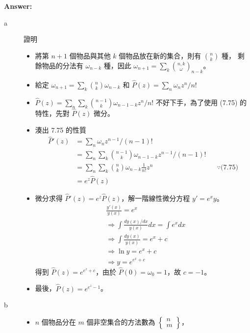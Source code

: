 \documentclass[11pt,fleqn]{article}
\renewcommand\part[1]{\vspace{.10in}\textbf{#1}}
\begin{document}
\part{Answer:}

\begin{description}
	\item[a] 證明
		\begin{itemize}
			\item 將第 $n+1$ 個物品與其他 $k$ 個物品放在新的集合，則有 $\binom{n}{k}$ 種，
				剩餘物品的分法有 $\omega_{n-k}$ 種，因此 $\omega_{n+1} = \sum_k \binom{n, k} \omega_{n-k}$。
			\item 給定 $\omega_{n+1} = \sum_k \binom{n}{k} \omega_{n-k}$ 和
					$\widehat{P}(z) = \sum_n \omega_n z^n / n!$
			\item $\widehat{P}(z) = \sum_n \sum_k \binom{n-1}{k} \omega_{n-1-k} z^n / n!$ 
				不好下手，為了使用 (7.75) 的特性，先對 $\widehat{P}(z)$ 微分。
			\item 湊出 7.75 的性質
				\begin{align*}
					\widehat{P}'(z) 
					&= \sum_n \omega_{n} z^{n-1}/(n-1)! \\
					&= \sum_n \sum_k \binom{n-1}{k} \omega_{n-1-k} z^{n-1}/(n-1)! \\
					&= \sum_n \sum_k \binom{n}{k} \omega_{n-k} \frac{1}{n!} z^{n} 
						&& \because \text{(7.75)} \\
					&= e^z \widehat{P}(z)
				\end{align*}
			\item
				微分求得 $\widehat{P}'(z) = e^z \widehat{P}(z)$，解一階線性微分方程 $y' = e^x y$。
				\begin{align*}
					& \frac{y'(x)}{y(x)} = e^x \\
					& \Rightarrow \int \frac{d y(x) / dx}{y(x)} dx = \int e^x dx \\
					& \Rightarrow \int \frac{d y(x)}{y(x)} = e^x + c \\
					& \Rightarrow \ln y = e^x + c\\
					& \Rightarrow y = e^{e^x + c}
				\end{align*}
				得到 $\widehat{P}(z) = e^{e^z+c}$，由於 $\widehat{P}(0)=\omega_0=1$，故 $c=-1$。
			\item 最後，$\widehat{P}(z) = e^{e^z-1}$。
		\end{itemize}
	\item[b]
		\begin{itemize}
			\item $n$ 個物品分在 $m$ 個非空集合的方法數為 $\begin{Bmatrix}n\\m\end{Bmatrix}$，

\end{itemize}
\end{description}
\end{document}
